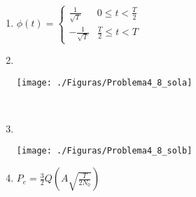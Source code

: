 \documentclass[es,boletin]{uah}
\begin{document}
{

\begin{enumerate}
	\item $\phi(t) = \left \{ \begin{array}{ll} \frac{1}{\sqrt{T}} & 0 \leq t < \frac{T}{2} \\  -\frac{1}{\sqrt{T}} & \frac{T}{2} \leq t < T \end{array} \right.$
	
	\item \ \\
	\begin{figure*}[h!] \centering\texttt{[image: ./Figuras/Problema4\_8\_sola]}	\end{figure*}
	\ \\
	\item \ \\
	\begin{figure*}[h!] 	\centering\texttt{[image: ./Figuras/Problema4\_8\_solb]} 	\end{figure*}
	
	\item $P_e = \frac{3}{2} Q \left ( A \sqrt{\frac{T}{2N_0}} \right ) $
	
\end{enumerate}

}
\end{document}
